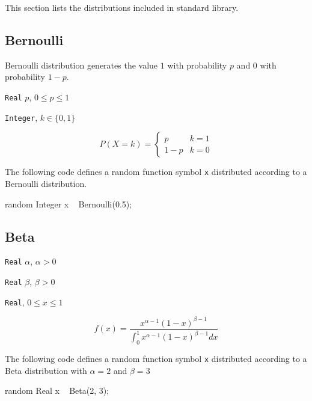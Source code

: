 This section lists the distributions included in \bl standard library.


\subsection{Bernoulli}
Bernoulli distribution generates the value $1$ with probability $p$ and $0$ with probability $1-p$. 

\begin{itemize*}
\item[] \verb|Real|
 $p$, $0 \leq p \leq 1$ 
\end{itemize*}

\begin{itemize*}
\item[] \verb|Integer|, $k \in \{0, 1\}$ 
\end{itemize*}

\[
	P(X = k) = \left\{
	  \begin{array}{lr}
	    p &    k = 1 \\
	    1-p &  k = 0
	  \end{array}
	\right.
\]

The following code defines a random function symbol \verb|x| distributed according to a Bernoulli distribution.
\begin{blogcode}
random Integer x ~ Bernoulli(0.5);
\end{blogcode}

\subsection{Beta}

\begin{itemize*}
\item[] \verb|Real| $\alpha$, $\alpha > 0$ 
\item[] \verb|Real| $\beta$, $\beta > 0$ 
\end{itemize*}

\begin{itemize*}
\item[]
\verb|Real|, $0 \leq x \leq 1$ 
\end{itemize*}

\[
	f(x) = \frac{x^{\alpha - 1} (1-x)^{\beta - 1}}{\int_{0}^{1} x^{\alpha - 1} (1-x)^{\beta - 1} dx}
\]

The following code defines a random function symbol \verb|x| distributed according to a Beta distribution with $\alpha = 2$ and $\beta = 3$
\begin{blogcode}
random Real x ~ Beta(2, 3);
\end{blogcode}


